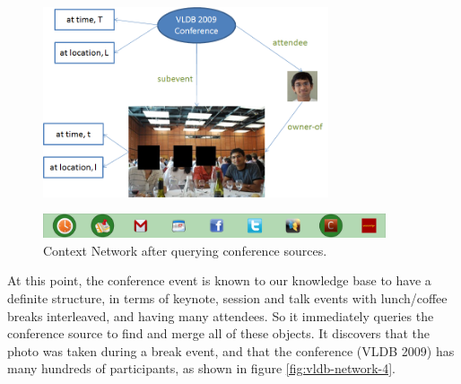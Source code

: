 \begin{figure}[h]
\centering
\includegraphics[width=0.75\textwidth]{media/chapter4/stacktrace/vldb-network-3.png}
\end{figure}
\begin{figure}[h]
\centering
\includegraphics[width=0.9\textwidth]{media/chapter4/stacktrace/vldb-source-1.png}
\caption{Context Network after querying conference sources.}
\label{fig:vldb-network-3}
\end{figure}

At this point, the conference event is known to our knowledge base to have a definite structure, in terms of keynote, session and talk events with lunch/coffee breaks interleaved, and having many attendees. So it immediately queries the conference source to find and merge all of these objects. It discovers that the photo was taken during a break event, and that the conference (VLDB 2009) has many hundreds of participants, as shown in figure \ref{fig:vldb-network-4}.

